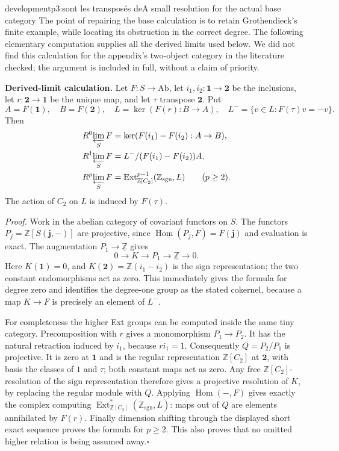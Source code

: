 \begin{dcomment}{development}{p3:sont les transposés de}{A small resolution for the actual base category}
The point of repairing the base calculation is to retain Grothendieck's finite example, while locating its obstruction in the correct degree. The following elementary computation supplies all the derived limits used below. We did not find this calculation for the appendix's two-object category in the literature checked; the argument is included in full, without a claim of priority.

\textbf{Derived-limit calculation.}\ours
Let $F:S\to\mathrm{Ab}$, let $i_1,i_2:\mathbf1\to\mathbf2$ be the inclusions, let $r:\mathbf2\to\mathbf1$ be the unique map, and let $\tau$ transpose $\mathbf2$. Put
\[
 A=F(\mathbf1),\quad B=F(\mathbf2),\quad
 L=\ker(F(r):B\to A),\quad
 L^- =\{v\in L:F(\tau)v=-v\}.
\]
Then
\[
 \begin{aligned}
 R^0\!\varprojlim_S F&=\ker(F(i_1)-F(i_2):A\to B),\\
 R^1\!\varprojlim_S F&=L^-/(F(i_1)-F(i_2))A,\\
 R^p\!\varprojlim_S F&=\operatorname{Ext}^{p-1}_{\mathbb Z[C_2]}
       (\mathbb Z_{\mathrm{sgn}},L)\qquad(p\ge2).
 \end{aligned}
\]
The action of $C_2$ on $L$ is induced by $F(\tau)$.

\emph{Proof.} Work in the abelian category of covariant functors on $S$. The functors $P_j=\mathbb Z[S(\mathbf j,-)]$ are projective, since $\operatorname{Hom}(P_j,F)=F(\mathbf j)$ and evaluation is exact. The augmentation $P_1\to\underline{\mathbb Z}$ gives
\[
 0\longrightarrow K\longrightarrow P_1
   \longrightarrow\underline{\mathbb Z}\longrightarrow0.
\]
Here $K(\mathbf1)=0$, and $K(\mathbf2)=\mathbb Z(i_1-i_2)$ is the sign representation; the two constant endomorphisms act as zero. This immediately gives the formula for degree zero and identifies the degree-one group as the stated cokernel, because a map $K\to F$ is precisely an element of $L^-$.

For completeness the higher Ext groups can be computed inside the same tiny category. Precomposition with $r$ gives a monomorphism $P_1\to P_2$. It has the natural retraction induced by $i_1$, because $ri_1=1$. Consequently $Q=P_2/P_1$ is projective. It is zero at $\mathbf1$ and is the regular representation $\mathbb Z[C_2]$ at $\mathbf2$, with basis the classes of $1$ and $\tau$; both constant maps act as zero. Any free $\mathbb Z[C_2]$-resolution of the sign representation therefore gives a projective resolution of $K$, by replacing the regular module with $Q$. Applying $\operatorname{Hom}(-,F)$ gives exactly the complex computing $\operatorname{Ext}^*_{\mathbb Z[C_2]}(\mathbb Z_{\mathrm{sgn}},L)$: maps out of $Q$ are elements annihilated by $F(r)$. Finally dimension shifting through the displayed short exact sequence proves the formula for $p\ge2$. This also proves that no omitted higher relation is being assumed away.\hfill$\square$


\end{dcomment}
